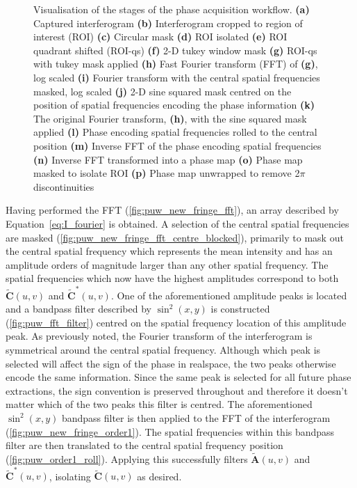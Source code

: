 \begin{figure}
\begin{subfigure}{0.23\textwidth}
		\caption{}
		\label{fig:puw_unwrapped_phase}
	\end{subfigure}
	\caption[Visualisation of the stages of the phase acquisition workflow.]{Visualisation of the stages of the phase acquisition workflow. \textbf{(a)} Captured interferogram \textbf{(b)} Interferogram cropped to region of interest (ROI) \textbf{(c)} Circular mask \textbf{(d)} ROI isolated \textbf{(e)} ROI quadrant shifted (ROI-qs) \textbf{(f)} 2-D tukey window mask \textbf{(g)} ROI-qs with tukey mask applied \textbf{(h)} Fast Fourier transform (FFT) of \textbf{(g)}, log scaled \textbf{(i)} Fourier transform with the central spatial frequencies masked, log scaled \textbf{(j)} 2-D sine squared mask centred on the position of spatial frequencies encoding the phase information \textbf{(k)} The original Fourier transform, \textbf{(h)}, with the sine squared mask applied \textbf{(l)} Phase encoding spatial frequencies rolled to the central position \textbf{(m)} Inverse FFT of the phase encoding spatial frequencies \textbf{(n)} Inverse FFT transformed into a phase map \textbf{(o)} Phase map masked to isolate ROI \textbf{(p)} Phase map unwrapped to remove 2$\pi$ discontinuities}
	\label{fig:phase_unwrap_workflow}
\end{figure}

Having performed the FFT (\ref{fig:puw_new_fringe_fft}), an array described by Equation~\ref{eq:I_fourier} is obtained. A selection of the central spatial frequencies are masked (\ref{fig:puw_new_fringe_fft_centre_blocked}), primarily to mask out the central spatial frequency which represents the mean intensity and has an amplitude orders of magnitude larger than any other spatial frequency. The spatial frequencies which now have the highest amplitudes correspond to both $\tilde{\boldsymbol{C}}(u,v)$ and $\tilde{\boldsymbol{C}}^{*}(u,v)$. One of the aforementioned amplitude peaks is located and a bandpass filter described by $\sin^{2}(x,y)$ is constructed (\ref{fig:puw_fft_filter}) centred on the spatial frequency location of this amplitude peak. As previously noted, the Fourier transform of the interferogram is symmetrical around the central spatial frequency. Although which peak is selected will affect the sign of the phase in realspace, the two peaks otherwise encode the same information. Since the same peak is selected for all future phase extractions, the sign convention is preserved throughout and therefore it doesn't matter which of the two peaks this filter is centred. The aforementioned $\sin^{2}(x,y)$ bandpass filter is then applied to the FFT of the interferogram (\ref{fig:puw_new_fringe_order1}). The spatial frequencies within this bandpass filter are then translated to the central spatial frequency position (\ref{fig:puw_order1_roll}). Applying this successfully filters $\tilde{\boldsymbol{A}}(u,v)$ and $\tilde{\boldsymbol{C}}^{*}(u,v)$, isolating $\tilde{\boldsymbol{C}}(u,v)$ as desired.

